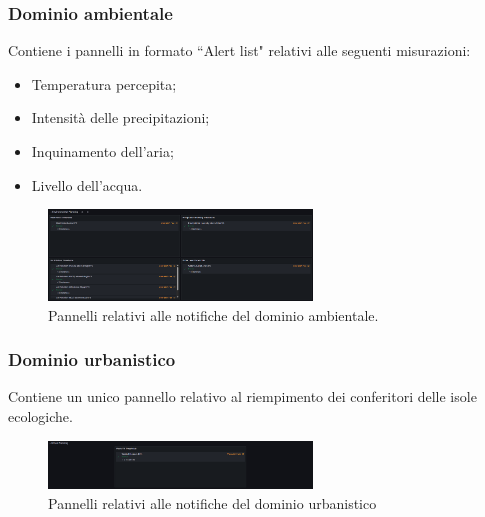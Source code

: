 \documentclass[8pt]{article}
\begin{document}
\subsubsection{Dominio ambientale}
Contiene i pannelli in formato ``Alert list" relativi alle seguenti misurazioni:
\begin{itemize}
\setlength\itemsep{0em}
    \item Temperatura percepita;
    \item Intensità delle precipitazioni;
    \item Inquinamento dell'aria;
    \item Livello dell'acqua.
\end{itemize}
\begin{figure}[H]
    \centering
    \includegraphics[width=7cm]{images_mu/environmental_thresholds.png}
    \caption{Pannelli relativi alle notifiche del dominio ambientale.}
    \label{fig:Pannelli relativi alle notifiche del dominio ambientale}
\end{figure}
\subsubsection{Dominio urbanistico}
Contiene un unico pannello relativo al riempimento dei conferitori delle isole ecologiche.
\begin{figure}[H]
    \centering
    \includegraphics[width=7cm]{images_mu/urban_thresholds.png}
    \caption{Pannelli relativi alle notifiche del dominio urbanistico}
    \label{fig:Pannelli relativi alle notifiche del dominio urbanistico}
\end{figure}
\end{document}
